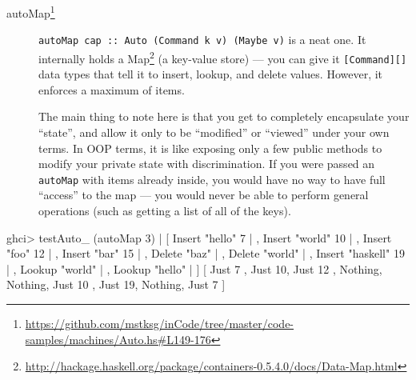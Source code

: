 \documentclass[]{article}
\newenvironment{Shaded}{}{}
\newcommand{\DataTypeTok}[1]{\textcolor[rgb]{0.56,0.13,0.00}{{#1}}}
\newcommand{\DecValTok}[1]{\textcolor[rgb]{0.25,0.63,0.44}{{#1}}}
\newcommand{\StringTok}[1]{\textcolor[rgb]{0.25,0.44,0.63}{{#1}}}
\newcommand{\FunctionTok}[1]{\textcolor[rgb]{0.02,0.16,0.49}{{#1}}}
\newcommand{\NormalTok}[1]{{#1}}
\renewcommand{\href}[2]{#2\footnote{\url{#1}}}
\begin{document}
\begin{description}
\item[\href{https://github.com/mstksg/inCode/tree/master/code-samples/machines/Auto.hs\#L149-176}{autoMap}]
\texttt{autoMap\ cap\ ::\ Auto\ (Command\ k\ v)\ (Maybe\ v)} is a neat
one. It internally holds a
\href{http://hackage.haskell.org/package/containers-0.5.4.0/docs/Data-Map.html}{Map}
(a key-value store) --- you can give it \texttt{{[}Command{]}{[}{]}}
data types that tell it to insert, lookup, and delete values. However,
it enforces a maximum of items.

The main thing to note here is that you get to completely encapsulate
your ``state'', and allow it only to be ``modified'' or ``viewed'' under
your own terms. In OOP terms, it is like exposing only a few public
methods to modify your private state with discrimination. If you were
passed an \texttt{autoMap} with items already inside, you would have no
way to have full ``access'' to the map --- you would never be able to
perform general operations (such as getting a list of all of the keys).
\end{description}

\begin{Shaded}
\begin{Highlighting}[]
\NormalTok{ghci}\FunctionTok{>} \NormalTok{testAuto_ (autoMap }\DecValTok{3}\NormalTok{)}
    \FunctionTok{|}   \NormalTok{[ }\DataTypeTok{Insert} \StringTok{"hello"} \DecValTok{7}
    \FunctionTok{|}   \NormalTok{, }\DataTypeTok{Insert} \StringTok{"world"} \DecValTok{10}
    \FunctionTok{|}   \NormalTok{, }\DataTypeTok{Insert} \StringTok{"foo"} \DecValTok{12}
    \FunctionTok{|}   \NormalTok{, }\DataTypeTok{Insert} \StringTok{"bar"} \DecValTok{15}
    \FunctionTok{|}   \NormalTok{, }\DataTypeTok{Delete} \StringTok{"baz"}
    \FunctionTok{|}   \NormalTok{, }\DataTypeTok{Delete} \StringTok{"world"}
    \FunctionTok{|}   \NormalTok{, }\DataTypeTok{Insert} \StringTok{"haskell"} \DecValTok{19}
    \FunctionTok{|}   \NormalTok{, }\DataTypeTok{Lookup} \StringTok{"world"}
    \FunctionTok{|}   \NormalTok{, }\DataTypeTok{Lookup} \StringTok{"hello"}
    \FunctionTok{|}   \NormalTok{]}
\NormalTok{[ }\DataTypeTok{Just} \DecValTok{7} \NormalTok{, }\DataTypeTok{Just} \DecValTok{10}\NormalTok{, }\DataTypeTok{Just} \DecValTok{12}
\NormalTok{, }\DataTypeTok{Nothing}\NormalTok{, }\DataTypeTok{Nothing}\NormalTok{, }\DataTypeTok{Just} \DecValTok{10}
\NormalTok{, }\DataTypeTok{Just} \DecValTok{19}\NormalTok{, }\DataTypeTok{Nothing}\NormalTok{, }\DataTypeTok{Just} \DecValTok{7}  \NormalTok{]}
\end{Highlighting}
\end{Shaded}
\end{document}
